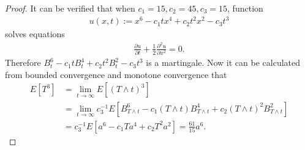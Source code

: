 \documentclass[12pt,a4paper]{amsart}
\theoremstyle{plain}
\theoremstyle{definition}
\theoremstyle{remark}
\numberwithin{equation}{section}
\begin{document}
\begin{proof}
It can be verified that when $c_1 = 15, c_2 = 45, c_3 = 15$, function 
\begin{align}
u(x,t):= x^6 - c_1 tx^4 + c_2 t^2 x^2 - c_3 t^3
\end{align}
solves equations
\begin{align}
\frac{\partial u}{\partial t} + \frac{1}{2} \frac{\partial^2 u}{ \partial x^2} = 0.
\end{align}
Therefore $B_t^6 - c_1tB_t^4+c_2t^2B_t^2-c_3t^3$ is a martingale.
Now it can be calculated from bounded convergence and monotone convergence that
\begin{align}
  E\left[ T^3 \right]
&= \lim_{t\to \infty} E\left[(T\wedge t)^3\right] 
  \\& =\lim_{t\to \infty} c_3^{-1}E\left[ B_{T\wedge t}^6 - c_1(T\wedge t)B_{T\wedge t}^4+c_2(T\wedge t)^2 B_{T\wedge t}^2 \right]
  \\& = c_3^{-1}E\left[ a^6 - c_1Ta^4+c_2T^2a^2 \right]
= \frac{61}{15}a^6.
\end{align}
\end{proof}
\end{document}
